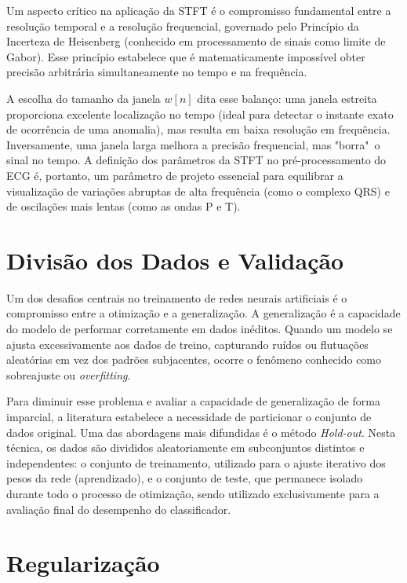 Um aspecto crítico na aplicação da STFT é o compromisso fundamental entre a resolução temporal e a resolução frequencial, governado pelo Princípio da 
Incerteza de Heisenberg (conhecido em processamento de sinais como limite de Gabor). Esse princípio estabelece que é matematicamente impossível obter 
precisão arbitrária simultaneamente no tempo e na frequência.

A escolha do tamanho da janela $w[n]$ dita esse balanço: uma janela estreita proporciona excelente localização no tempo (ideal para detectar o instante 
exato de ocorrência de uma anomalia), mas resulta em baixa resolução em frequência. Inversamente, uma janela larga melhora a precisão frequencial, 
mas "borra"\ o sinal no tempo. A definição dos parâmetros da STFT no pré-processamento do ECG é, portanto, um parâmetro de projeto essencial para 
equilibrar a visualização de variações abruptas de alta frequência (como o complexo QRS) e de oscilações mais lentas (como as ondas P e T).


\section{Divisão dos Dados e Validação}

Um dos desafios centrais no treinamento de redes neurais artificiais é o compromisso entre a otimização e a generalização. A generalização é a
capacidade do modelo de performar corretamente em dados inéditos. Quando um modelo se ajusta excessivamente aos dados de treino, capturando ruídos 
ou flutuações aleatórias em vez dos padrões subjacentes, ocorre o fenômeno conhecido como sobreajuste ou \textit{overfitting}.

Para diminuir esse problema e avaliar a capacidade de generalização de forma imparcial, a literatura estabelece a necessidade de particionar o conjunto 
de dados original. Uma das abordagens mais difundidas é o método \textit{Hold-out}. Nesta técnica, os dados são divididos aleatoriamente em subconjuntos 
distintos e independentes: o conjunto de treinamento, utilizado para o ajuste iterativo dos pesos da rede (aprendizado), e o conjunto de teste, que 
permanece isolado durante todo o processo de otimização, sendo utilizado exclusivamente para a avaliação final do desempenho do classificador.

\section{Regularização}

